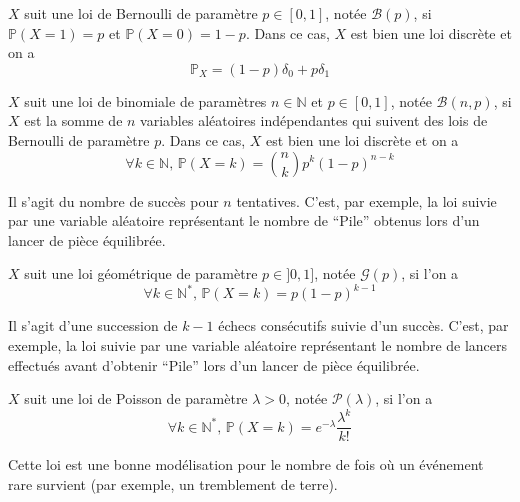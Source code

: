 	\begin{example}
		$X$ suit une loi de Bernoulli de paramètre $p \in [0,1]$, notée $\mathcal{B}(p)$, si $\mathbb{P}(X=1) = p$ et $\mathbb{P}(X=0)=1-p$. Dans ce cas, $X$ est bien une loi discrète et on a
		\[ \mathbb{P}_X = (1-p) \delta_0 + p \delta_1 \]
	\end{example}

	\begin{example}
		$X$ suit une loi de binomiale de paramètres $n \in \mathbb{N}$ et $p \in [0,1]$, notée $\mathcal{B}(n, p)$, si $X$ est la somme de $n$ variables aléatoires indépendantes qui suivent des lois de Bernoulli de paramètre $p$. Dans ce cas, $X$ est bien une loi discrète et on a
		\[ \forall k \in \mathbb{N}, \, \mathbb{P}(X = k) = \binom{n}{k} p^k (1-p)^{n-k} \]
	\end{example}

	\begin{remark}
		Il s'agit du nombre de succès pour $n$ tentatives.
		\newpar
		C'est, par exemple, la loi suivie par une variable aléatoire représentant le nombre de ``Pile'' obtenus lors d'un lancer de pièce équilibrée.
	\end{remark}

	\begin{example}
		$X$ suit une loi géométrique de paramètre $p \in ]0,1]$, notée $\mathcal{G}(p)$, si l'on a
		\[ \forall k \in \mathbb{N}^{*}, \, \mathbb{P}(X = k) = p(1-p)^{k-1} \]
	\end{example}

	\begin{remark}
		Il s'agit d'une succession de $k-1$ échecs consécutifs suivie d'un succès.
		\newpar
		C'est, par exemple, la loi suivie par une variable aléatoire représentant le nombre de lancers effectués avant d'obtenir ``Pile'' lors d'un lancer de pièce équilibrée.
	\end{remark}

	\begin{example}
		$X$ suit une loi de Poisson de paramètre $\lambda > 0$, notée $\mathcal{P}(\lambda)$, si l'on a
		\[ \forall k \in \mathbb{N}^{*}, \, \mathbb{P}(X = k) = e^{-\lambda} \frac{\lambda^k}{k!} \]
	\end{example}

	\reference{298}

	\begin{remark}
		Cette loi est une bonne modélisation pour le nombre de fois où un événement rare survient (par exemple, un tremblement de terre).
	\end{remark}

